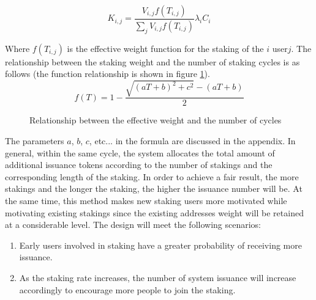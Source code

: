 \begin{equation}
  K_{i,j} = \frac{V_{i,j} f(T_{i,j})}{\sum_j V_{i,j} f(T_{i,j})} \lambda_i C_i
\end{equation}

Where \(f(T_{i,j})\) is the effective weight function for the staking of the \(i\) user\(j\). The relationship between the staking weight and the number of staking cycles is as follows (the function relationship is shown in figure \ref{weight}).
\begin{equation}
  f(T) = 1 - \frac{\sqrt{(aT+b)^2+c^2}-(aT+b)}{2}
\end{equation}

\begin{figure}[h]
\centering
\caption{Relationship between the effective weight and the number of cycles}\label{weight}
\end{figure}

The parameters $a$, $b$, $c$, etc... in the formula are discussed in the appendix. In general, within the same cycle, the system allocates the total amount of additional issuance tokens according to the number of stakings and the corresponding length of the staking. In order to achieve a fair result, the more stakings and the longer the staking, the higher the issuance number will be. At the same time, this method makes new staking users more motivated while motivating existing stakings since the existing addresses weight will be retained at a considerable level. The design will meet the following scenarios:

\begin{enumerate}[\hspace{1cm}(a)]
  \item Early users involved in staking have a greater probability of receiving more issuance.
  \item As the staking rate increases, the number of system issuance will increase accordingly to encourage more people to join the staking.
\end{enumerate}

